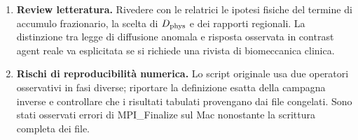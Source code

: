 \documentclass[11pt,a4paper]{article}
\begin{document}
\begin{enumerate}
\item \textbf{Review letteratura.} Rivedere con le relatrici le ipotesi fisiche del termine di accumulo frazionario, la scelta di $D_{\rm phys}$ e dei rapporti regionali. La distinzione tra legge di diffusione anomala e risposta osservata in contrast agent reale va esplicitata se si richiede una rivista di biomeccanica clinica.
\item \textbf{Rischi di reproducibilit\`a numerica.} Lo script originale usa due operatori osservativi in fasi diverse; riportare la definizione esatta della campagna inverse e controllare che i risultati tabulati provengano dai file congelati. Sono stati osservati errori di MPI\_Finalize sul Mac nonostante la scrittura completa dei file.
\end{enumerate}
\end{document}
